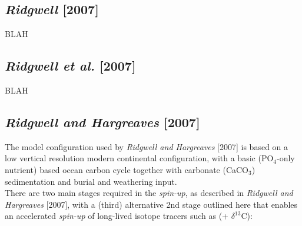 \documentclass[10pt,twoside]{article}
\begin{document}
\subsection{\textit{Ridgwell} [2007]}

BLAH


\subsection{\textit{Ridgwell et al.} [2007]}

BLAH


\subsection{\textit{Ridgwell and Hargreaves} [2007]}

The model configuration used by \textit{Ridgwell and Hargreaves} [2007] is based on a low vertical resolution modern continental configuration, with a basic (PO$_{4}$-only nutrient) based ocean carbon cycle together with carbonate (CaCO$_{3}$) sedimentation and burial and weathering input.
\\ There are two main stages required in the \textit{spin-up}, as described in \textit{Ridgwell and Hargreaves} [2007], with a (third) alternative 2nd stage outlined here that enables an accelerated \textit{spin-up} of long-lived isotope tracers such as (+ $\delta^{13}$C):
\end{document}
